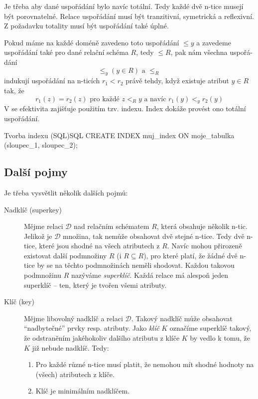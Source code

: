 Je třeba aby dané uspořádání bylo navíc totální. Tedy každé dvě n-tice musejí být porovnatelné. Relace uspořádání musí být tranzitivní, symetrická a reflexivní. Z požadavku totality musí být uspořádání také úplné.

Pokud máme na každé doméně zavedeno toto uspořádání $\leq y$ a zavedeme uspořádání také pro dané relační schéma $R$, tedy $\leq R$, pak nám všechna uspořá-dání
$$
\leq_{y}(y \in R) \text{ a } \leq_{R}
$$
indukují uspořádání na n-ticích $r_{1} < r_{2}$ právě tehdy, když existuje atribut $y \in R$ tak, že
$$
r_{1}(z) = r_{2}(z) \text{ pro každé } z <_{R} y \text{ a navíc } r_{1}(y) <_{y} r_{2}(y)
$$
V  se efektivita zajišťuje použitím tzv. indexu. Index dokáže provést ono totální uspořádání.
\begin{upcode}{Tvorba indexu (SQL)}{}{SQL}
CREATE INDEX muj_index ON moje_tabulka (sloupec_1, sloupec_2);
\end{upcode}

\subsection{Další pojmy}
Je třeba vysvětlit několik dalších pojmů:
\begin{description}
\item[Nadklíč (superkey)] Mějme relaci $\mathcal{D}$ nad relačním schématem $R$, která obsahuje několik n-tic. Jelikož je $\mathcal{D}$ množina, tak nemůže obsahovat dvě stejné n-tice. Tedy dvě n-tice, které jsou shodné na všech atributech z $R$. Navíc mohou přirozeně existovat další podmnožiny $R$ (i $R \subseteq R$), pro které platí, že žádné dvě n-tice by se na těchto podmnožinách neměli shodovat. Každou takovou podmnožinu $R$ nazýváme \textit{superklíč}. Každá relace má alespoň jeden superklíč -- ten, který je tvořen všemi atributy.
\item[Klíč (key)] Mějme libovolný nadklíč a relaci $\mathcal{D}$. Takový nadklíč může obsahovat \enquote{nadbytečné} prvky resp. atributy. Jako \textit{klíč} $K$ označíme superklíč takový, že odstraněním jakéhokoliv dalšího atributu z klíče $K$ by vedlo k tomu, že $K$ již nebude nadklíč. Tedy:
\begin{enumerate}
\item Pro každé různé n-tice musí platit, že nemohou mít shodné hodnoty na (všech) atributech z klíče.
\item Klíč je minimálním nadklíčem.
\end{enumerate}
\end{description}

